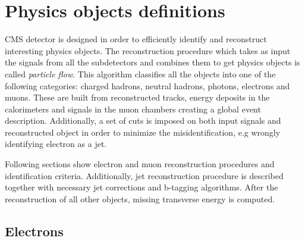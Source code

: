 \chapter{Physics objects definitions} %

\label{Chapter5} %


CMS detector is designed in order to efficiently identify and reconstruct interesting physics objects. The reconstruction procedure which takes as input the signals from all the subdetectors and combines them to get physics objects is called \textit{particle flow}. \cite{CMS:2009nxa} This algorithm classifies all the objects into one of the following categories: charged hadrons, neutral hadrons, photons, electrons and muons. These are built from reconstructed tracks, energy deposits in the calorimeters and signals in the muon chambers creating a global event description. Additionally, a set of cuts is imposed on both input signals and reconstructed object in order to minimize the misidentification, e.g wrongly identifying electron as a jet. 
\par Following sections show electron and muon reconstruction procedures and identification criteria. Additionally, jet reconstruction procedure is described together with necessary jet corrections and b-tagging algorithms. After the reconstruction of all other objects, missing transverse energy is computed.


\section{Electrons}

